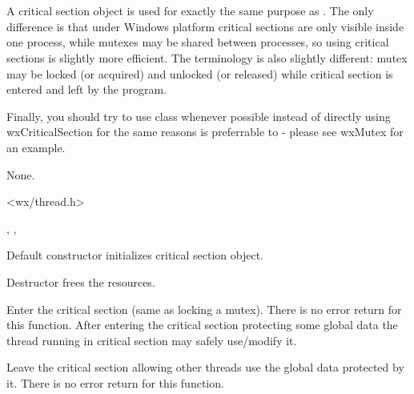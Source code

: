\section{}\label{wxcriticalsection}

A critical section object is used for exactly the same purpose as 
. The only difference is that under Windows platform
critical sections are only visible inside one process, while mutexes may be
shared between processes, so using critical sections is slightly more
efficient. The terminology is also slightly different: mutex may be locked (or
acquired) and unlocked (or released) while critical section is entered and left
by the program.

Finally, you should try to use 
 class whenever
possible instead of directly using wxCriticalSection for the same reasons 
 is preferrable to 
 - please see wxMutex for an example.


None.


<wx/thread.h>


, , 


\label{wxcriticalsectionctor}


Default constructor initializes critical section object.

\label{wxcriticalsectiondtor}


Destructor frees the resources.

\label{wxcriticalsectionenter}


Enter the critical section (same as locking a mutex). There is no error return
for this function. After entering the critical section protecting some global
data the thread running in critical section may safely use/modify it.

\label{wxcriticalsectionleave}


Leave the critical section allowing other threads use the global data protected
by it. There is no error return for this function.

